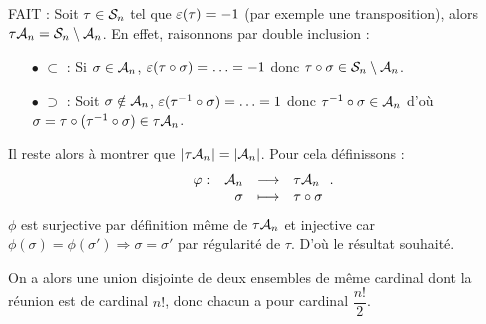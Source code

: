 \documentclass{magnolia}
\begin{document}
\begin{sol}
FAIT : Soit $\tau \in \mathcal{S}_{n}$ tel que $\signature(\tau)=-1$ (par exemple une transposition), alors $\tau \mathcal{A}_{n}=\mathcal{S}_{n}\setminus \mathcal{A}_{n}$.
En effet, raisonnons par double inclusion :
\begin{itemize}
\item[$\bullet$] $\subset$ : Si $\sigma \in \mathcal{A}_{n}$, $\signature(\tau\circ\sigma)=\ldots=-1$ donc $\tau\circ\sigma\in \mathcal{S}_{n}\setminus \mathcal{A}_{n}$.
\item[$\bullet$] $\supset$ : Soit $\sigma\notin \mathcal{A}_{n}$, $\signature(\tau^{-1}\circ \sigma)=\ldots=1$ donc $\tau^{-1}\circ \sigma \in \mathcal{A}_{n}$ d'où $\sigma=\tau\circ(\tau^{-1}\circ \sigma) \in \tau \mathcal{A}_{n}$.
\end{itemize}

Il reste alors à montrer que $\left|\tau \mathcal{A}_{n}\right|=\left|\mathcal{A}_{n}\right|$. Pour cela définissons :
$$\begin{array}[t]{lrcl} \displaystyle{\varphi} : & \displaystyle{\mathcal{A}_{n}} & \longrightarrow & \displaystyle{\tau \mathcal{A}_{n}} \\ & \displaystyle{\sigma} & \longmapsto & \displaystyle{\tau\circ \sigma} \end{array}.$$
$\phi$ est surjective par définition même de $\tau \mathcal{A}_{n}$ et injective car $\phi(\sigma)=\phi(\sigma')\Rightarrow \sigma=\sigma'$ par régularité de $\tau$.
D'où le résultat souhaité.

On a alors une union disjointe de deux ensembles de même cardinal dont la réunion est de cardinal $n!$, donc chacun a pour cardinal $\dfrac{n!}{2}$.
\end{sol}




\end{document}

